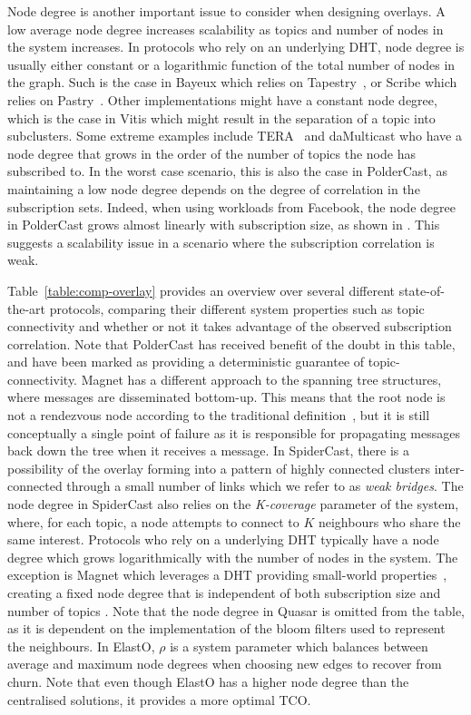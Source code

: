 Node degree is another important issue to consider when designing
overlays. A low average node degree increases scalability as topics and
number of nodes in the system increases. In protocols who rely on an
underlying DHT, node degree is usually either constant or a logarithmic function of the
total number of nodes in the graph. Such is the case in Bayeux which
relies on Tapestry~\cite{tapestry}, or Scribe which relies on
Pastry~\cite{Rowstron:2001}. Other implementations might have a constant
node degree, which is the case in Vitis which might result in the
separation of a topic into subclusters. Some extreme examples include
TERA~\cite{Baldoni:2007} and daMulticast who have a node degree that
grows in the order of the number of topics the node has subscribed to.
In the worst
case scenario, this is also the case in PolderCast, as maintaining a low node
degree depends on the degree of correlation in the subscription sets.
Indeed, when using workloads from Facebook, the node degree in
PolderCast grows almost linearly with subscription size, as shown in
\cite{Setty:2012}. This suggests a scalability issue in a scenario where the
subscription correlation is weak.



Table~\ref{table:comp-overlay} provides an overview over several
different state-of-the-art protocols, comparing their different system
properties such as topic connectivity and whether or not it takes
advantage of the observed subscription correlation.  Note that
PolderCast has received benefit of the doubt in this table, and have
been marked as providing a deterministic guarantee of
topic-connectivity. Magnet has a different approach to the spanning tree
structures, where messages are disseminated bottom-up. This means that
the root node is not a rendezvous node according to  the traditional
definition~\cite{baldoni2005distributed}, but it is still conceptually
a single point of failure as it is responsible for propagating messages
back down the tree when it receives a message. In SpiderCast, there is a possibility
of the overlay forming into a pattern of highly connected clusters
inter-connected through a small number of links which we refer to as
\emph{weak bridges}. The node degree in SpiderCast also relies on the
\emph{K-coverage} parameter of the system, where, for each topic, a node
attempts to connect to $K$ neighbours who share the same interest.
Protocols who rely on a underlying DHT typically have a node degree
which grows logarithmically with the number of nodes in the system. The
exception is Magnet which leverages a DHT providing small-world
properties~\cite{girdzijauskas2007oscar}, creating a fixed node degree
that is independent of both subscription size and number of topics
\cite{Zhuang:2001}.  Note that the node degree in Quasar is omitted from
the table, as it is dependent on the implementation of the bloom filters
used to represent the neighbours. In ElastO, $\rho$ is a system parameter
which balances between average and maximum node degrees when choosing
new edges to recover from churn. Note that even though ElastO has a
higher node degree than the centralised solutions, it provides a more
optimal TCO.\

